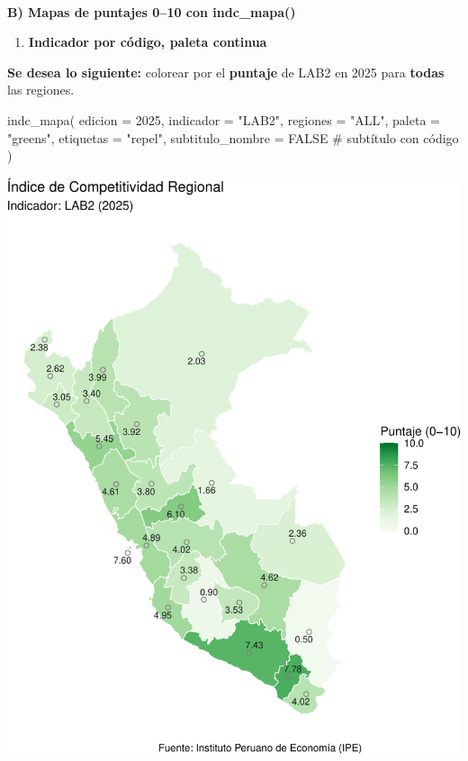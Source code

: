 \documentclass[
  11pt,
  letterpaper,
  DIV=11,
  numbers=noendperiod]{scrartcl}
\makeatletter
\let\oldparagraph\paragraph
\renewcommand{\paragraph}{
    \@ifstar
      \xxxParagraphStar
      \xxxParagraphNoStar
  }
\newcommand{\xxxParagraphStar}[1]{\oldparagraph*{#1}\mbox{}}
\newcommand{\xxxParagraphNoStar}[1]{\oldparagraph{#1}\mbox{}}
\newenvironment{Shaded}{\begin{snugshade}}{\end{snugshade}}
\newcommand{\AttributeTok}[1]{\textcolor[rgb]{0.40,0.45,0.13}{#1}}
\newcommand{\CommentTok}[1]{\textcolor[rgb]{0.37,0.37,0.37}{#1}}
\newcommand{\ConstantTok}[1]{\textcolor[rgb]{0.56,0.35,0.01}{#1}}
\newcommand{\DecValTok}[1]{\textcolor[rgb]{0.68,0.00,0.00}{#1}}
\newcommand{\FunctionTok}[1]{\textcolor[rgb]{0.28,0.35,0.67}{#1}}
\newcommand{\NormalTok}[1]{\textcolor[rgb]{0.00,0.23,0.31}{#1}}
\newcommand{\StringTok}[1]{\textcolor[rgb]{0.13,0.47,0.30}{#1}}
\providecommand{\tightlist}{%
  \setlength{\itemsep}{0pt}\setlength{\parskip}{0pt}}\usepackage{longtable,booktabs,array}
\makeatother
\begin{document}
\paragraph{\texorpdfstring{\textbf{B) Mapas de puntajes 0--10 con
indc\_mapa()}}{B) Mapas de puntajes 0--10 con indc\_mapa()}}\label{b-mapas-de-puntajes-010-con-indc_mapa}

\begin{enumerate}
\def\labelenumi{\arabic{enumi}.}
\tightlist
\item
  \textbf{Indicador por código, paleta continua}
\end{enumerate}

\textbf{Se desea lo siguiente:} colorear por el \textbf{puntaje} de LAB2
en 2025 para \textbf{todas} las regiones.

\begin{Shaded}
\begin{Highlighting}[]
\FunctionTok{indc\_mapa}\NormalTok{(}
  \AttributeTok{edicion          =} \DecValTok{2025}\NormalTok{,}
  \AttributeTok{indicador        =} \StringTok{"LAB2"}\NormalTok{,}
  \AttributeTok{regiones         =} \StringTok{"ALL"}\NormalTok{,}
  \AttributeTok{paleta           =} \StringTok{"greens"}\NormalTok{,}
  \AttributeTok{etiquetas        =} \StringTok{"repel"}\NormalTok{,}
  \AttributeTok{subtitulo\_nombre =} \ConstantTok{FALSE}  \CommentTok{\# subtítulo con código}
\NormalTok{)}
\end{Highlighting}
\end{Shaded}

\includegraphics{Manual_files/figure-pdf/unnamed-chunk-86-1.pdf}
\end{document}
